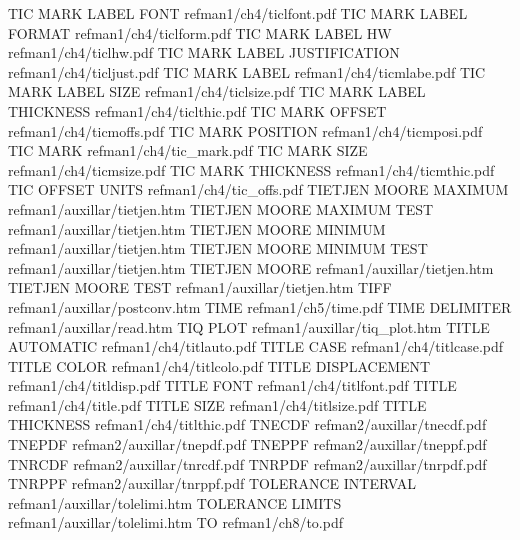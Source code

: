 TIC MARK LABEL FONT                     refman1/ch4/ticlfont.pdf
TIC MARK LABEL FORMAT                   refman1/ch4/ticlform.pdf
TIC MARK LABEL HW                       refman1/ch4/ticlhw.pdf
TIC MARK LABEL JUSTIFICATION            refman1/ch4/ticljust.pdf
TIC MARK LABEL                          refman1/ch4/ticmlabe.pdf
TIC MARK LABEL SIZE                     refman1/ch4/ticlsize.pdf
TIC MARK LABEL THICKNESS                refman1/ch4/ticlthic.pdf
TIC MARK OFFSET                         refman1/ch4/ticmoffs.pdf
TIC MARK POSITION                       refman1/ch4/ticmposi.pdf
TIC MARK                                refman1/ch4/tic_mark.pdf
TIC MARK SIZE                           refman1/ch4/ticmsize.pdf
TIC MARK THICKNESS                      refman1/ch4/ticmthic.pdf
TIC OFFSET UNITS                        refman1/ch4/tic_offs.pdf
TIETJEN MOORE MAXIMUM                   refman1/auxillar/tietjen.htm
TIETJEN MOORE MAXIMUM TEST              refman1/auxillar/tietjen.htm
TIETJEN MOORE MINIMUM                   refman1/auxillar/tietjen.htm
TIETJEN MOORE MINIMUM TEST              refman1/auxillar/tietjen.htm
TIETJEN MOORE                           refman1/auxillar/tietjen.htm
TIETJEN MOORE TEST                      refman1/auxillar/tietjen.htm
TIFF                                    refman1/auxillar/postconv.htm
TIME                                    refman1/ch5/time.pdf
TIME DELIMITER                          refman1/auxillar/read.htm
TIQ PLOT                                refman1/auxillar/tiq_plot.htm
TITLE AUTOMATIC                         refman1/ch4/titlauto.pdf
TITLE CASE                              refman1/ch4/titlcase.pdf
TITLE COLOR                             refman1/ch4/titlcolo.pdf
TITLE DISPLACEMENT                      refman1/ch4/titldisp.pdf
TITLE FONT                              refman1/ch4/titlfont.pdf
TITLE                                   refman1/ch4/title.pdf
TITLE SIZE                              refman1/ch4/titlsize.pdf
TITLE THICKNESS                         refman1/ch4/titlthic.pdf
TNECDF                                  refman2/auxillar/tnecdf.pdf
TNEPDF                                  refman2/auxillar/tnepdf.pdf
TNEPPF                                  refman2/auxillar/tneppf.pdf
TNRCDF                                  refman2/auxillar/tnrcdf.pdf
TNRPDF                                  refman2/auxillar/tnrpdf.pdf
TNRPPF                                  refman2/auxillar/tnrppf.pdf
TOLERANCE INTERVAL                      refman1/auxillar/tolelimi.htm
TOLERANCE LIMITS                        refman1/auxillar/tolelimi.htm
TO                                      refman1/ch8/to.pdf
